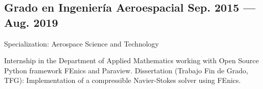 \subsection{{Grado en Ingeniería Aeroespacial} \hfill	Sep. 2015 --- Aug. 2019}  
\begin{zitemize}
\item Specialization: Aerospace Science and Technology %

\item Internship in the Department of Applied Mathematics working with Open Source Python framework FEnics and
Paraview. Dissertation (Trabajo Fin de Grado, TFG): Implementation of a compressible Navier-Stokes solver using FEnics. 

\end{zitemize}
